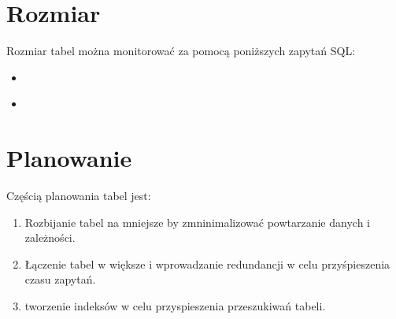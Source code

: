 \documentclass[letterpaper,10pt,polish]{sphinxmanual}
\begin{document}
\section{Rozmiar}
\label{\detokenize{rozdzialy/rozdzial2:rozmiar}}
\sphinxAtStartPar
Rozmiar tabel można monitorować za pomocą poniższych zapytań SQL:
\begin{itemize}
\item {} 
\sphinxAtStartPar
{}

\end{itemize}

\sphinxAtStartPar
{}
\begin{itemize}
\item {} 
\sphinxAtStartPar
{}

\end{itemize}

\begin{sphinxVerbatim}[commandchars=\\\{\}]
\end{sphinxVerbatim}


\section{Planowanie}
\label{\detokenize{rozdzialy/rozdzial2:planowanie}}
\sphinxAtStartPar
Częścią planowania tabel jest:
\begin{enumerate}
%
\item {} 
\sphinxAtStartPar
{} \sphinxhyphen{} Rozbijanie tabel na mniejsze by zmninimalizować powtarzanie danych i zależności.

\item {} 
\sphinxAtStartPar
{} \sphinxhyphen{} Łączenie tabel w większe i wprowadzanie redundancji w celu przyśpieszenia czasu zapytań.

\item {} 
\sphinxAtStartPar
{} \sphinxhyphen{} tworzenie indeksów w celu przyspieszenia przeszukiwań tabeli.

\end{enumerate}
\end{document}
